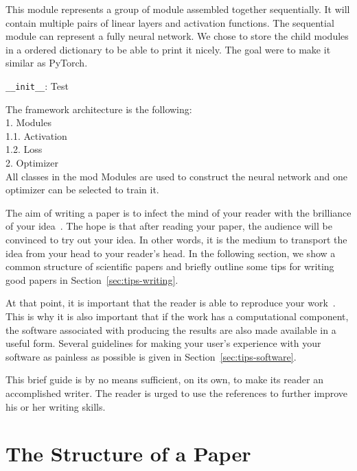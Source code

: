 \documentclass[10pt,conference,compsocconf]{IEEEtran}
\begin{document}
This module represents a group of module assembled together sequentially. It will contain multiple pairs of linear layers and activation functions. The sequential module can represent a fully neural network. We chose to store the child modules in a ordered dictionary to be able to print it nicely. The goal were to make it similar as PyTorch. 

\texttt{\_\_init\_\_}: Test









The framework architecture is the following: \\
1. Modules \\
1.1. Activation \\
1.2. Loss \\
2. Optimizer \\

All classes in the mod
Modules are used to construct the neural network and one optimizer can be selected to train it. 




The aim of writing a paper is to infect the mind of your reader with
the brilliance of your idea~\cite{jones08}. 
The hope is that after reading your
paper, the audience will be convinced to try out your idea. In other
words, it is the medium to transport the idea from your head to your
reader's head. 
In the following
section, we show a common structure of scientific papers and briefly
outline some tips for writing good papers in
Section~\ref{sec:tips-writing}.

At that
point, it is important that the reader is able to reproduce your
work~\cite{schwab00,wavelab,gentleman05}. This is why it is also
important that if the work has a computational component, the software
associated with producing the results are also made available in a
useful form. Several guidelines for making your user's experience with
your software as painless as possible is given in
Section~\ref{sec:tips-software}.

This brief guide is by no means sufficient, on its own, to
make its reader an accomplished writer. The reader is urged to use the
references to further improve his or her writing skills.

\section{The Structure of a Paper}
\label{sec:structure-paper}
\end{document}
